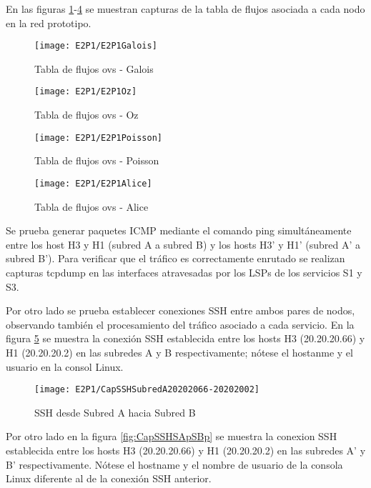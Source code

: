 En las figuras \ref{fig:CU2P1DumpFlows1}-\ref{fig:CU2P1DumpFlows4} se muestran capturas de la tabla de flujos asociada a cada nodo en la red prototipo.

\begin{figure}[ht!] 
\centering    
\texttt{[image: E2P1/E2P1Galois]}
\caption[Tabla de flujos ovs - Galois]{Tabla de flujos ovs - Galois}
\label{fig:CU2P1DumpFlows1}
\end{figure}

\begin{figure}[h!] 
\centering    
\texttt{[image: E2P1/E2P1Oz]}
\caption[Tabla de flujos ovs - Oz]{Tabla de flujos ovs - Oz}
\label{fig:CU2P1DumpFlows2}
\end{figure}

\begin{figure}[h!] 
\centering    
\texttt{[image: E2P1/E2P1Poisson]}
\caption[Tabla de flujos ovs - Poisson]{Tabla de flujos ovs - Poisson}
\label{fig:CU2P1DumpFlows3}
\end{figure}

\begin{figure}[h!] 
\centering    
\texttt{[image: E2P1/E2P1Alice]}
\caption[Tabla de flujos ovs - Alice]{Tabla de flujos ovs - Alice}
\label{fig:CU2P1DumpFlows4}
\end{figure}

\newpage
Se prueba generar paquetes ICMP mediante el comando ping simultáneamente entre los host H3 y H1 (subred A a subred B) y los hosts H3' y H1' (subred A' a subred B'). Para verificar que el tr\'afico es correctamente enrutado se realizan capturas tcpdump en las interfaces atravesadas por los LSPs de los servicios S1 y S3.

Por otro lado se prueba establecer conexiones SSH entre ambos pares de nodos, observando tambi\'en el procesamiento del tr\'afico asociado a cada servicio. En la figura \ref{fig:CapSSHSASB} se muestra la conexi\'on SSH establecida entre los hosts H3 (20.20.20.66) y H1 (20.20.20.2) en las subredes A y B respectivamente; n\'otese el hostanme y el usuario en la consol Linux.

\begin{figure}[h!] 
\centering    
\texttt{[image: E2P1/CapSSHSubredA20202066-20202002]}
\caption[SSH desde Subred A hacia Subred B]{SSH desde Subred A hacia Subred B}
\label{fig:CapSSHSASB}
\end{figure}

Por otro lado en la figura \ref{fig:CapSSHSApSBp} se muestra la conexion SSH establecida entre los hosts H3 (20.20.20.66) y H1 (20.20.20.2) en las subredes A' y B' respectivamente. N\'otese el hostname y el nombre de usuario de la consola Linux diferente al de la conexi\'on SSH anterior. 

